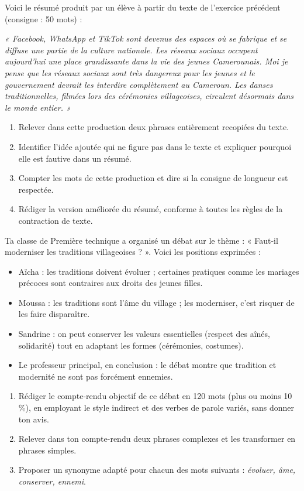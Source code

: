 \documentclass[11pt]{article}
\begin{document}
\begin{exercice}
Voici le résumé produit par un élève à partir du texte de l'exercice précédent (consigne : 50 mots) :

\emph{« Facebook, WhatsApp et TikTok sont devenus des espaces où se fabrique et se diffuse une partie de la culture nationale. Les réseaux sociaux occupent aujourd'hui une place grandissante dans la vie des jeunes Camerounais. Moi je pense que les réseaux sociaux sont très dangereux pour les jeunes et le gouvernement devrait les interdire complètement au Cameroun. Les danses traditionnelles, filmées lors des cérémonies villageoises, circulent désormais dans le monde entier. »}

\begin{enumerate}
\item Relever dans cette production deux phrases entièrement recopiées du texte.
\item Identifier l'idée ajoutée qui ne figure pas dans le texte et expliquer pourquoi elle est fautive dans un résumé.
\item Compter les mots de cette production et dire si la consigne de longueur est respectée.
\item Rédiger la version améliorée du résumé, conforme à toutes les règles de la contraction de texte.
\end{enumerate}
\end{exercice}

\begin{exercice}
Ta classe de Première technique a organisé un débat sur le thème : « Faut-il moderniser les traditions villageoises ? ». Voici les positions exprimées :

\begin{itemize}
\item Aïcha : les traditions doivent évoluer ; certaines pratiques comme les mariages précoces sont contraires aux droits des jeunes filles.
\item Moussa : les traditions sont l'âme du village ; les moderniser, c'est risquer de les faire disparaître.
\item Sandrine : on peut conserver les valeurs essentielles (respect des aînés, solidarité) tout en adaptant les formes (cérémonies, costumes).
\item Le professeur principal, en conclusion : le débat montre que tradition et modernité ne sont pas forcément ennemies.
\end{itemize}

\begin{enumerate}
\item Rédiger le compte-rendu objectif de ce débat en 120 mots (plus ou moins 10 \%), en employant le style indirect et des verbes de parole variés, sans donner ton avis.
\item Relever dans ton compte-rendu deux phrases complexes et les transformer en phrases simples.
\item Proposer un synonyme adapté pour chacun des mots suivants : \emph{évoluer, âme, conserver, ennemi}.
\end{enumerate}
\end{exercice}
\end{document}
